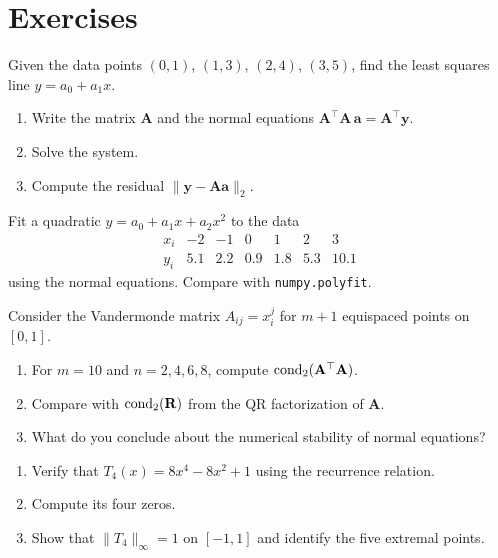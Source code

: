 \section{Exercises}

\begin{exercise}[$\star$]
\label{ex:ch6-ls-line}
Given the data points $(0,1)$, $(1,3)$, $(2,4)$, $(3,5)$, find the least squares line $y = a_0 + a_1 x$.
\begin{enumerate}
    \item Write the matrix $\mathbf{A}$ and the normal equations $\mathbf{A}^\top\mathbf{A}\,\mathbf{a} = \mathbf{A}^\top\mathbf{y}$.
    \item Solve the system.
    \item Compute the residual $\|\mathbf{y} - \mathbf{A}\mathbf{a}\|_2$.
\end{enumerate}
\end{exercise}

\begin{exercise}[$\star$]
\label{ex:ch6-parabola}
Fit a quadratic $y = a_0 + a_1 x + a_2 x^2$ to the data
\[
\begin{array}{c|cccccc}
    x_i & -2 & -1 & 0 & 1 & 2 & 3 \\
    \hline
    y_i & 5.1 & 2.2 & 0.9 & 1.8 & 5.3 & 10.1
\end{array}
\]
using the normal equations. Compare with \texttt{numpy.polyfit}.
\end{exercise}

\begin{exercise}[$\star\star$]
\label{ex:ch6-conditioning}
Consider the Vandermonde matrix $A_{ij} = x_i^j$ for $m+1$ equispaced points on $[0,1]$.
\begin{enumerate}
    \item For $m = 10$ and $n = 2, 4, 6, 8$, compute $\mathrm{cond}_2(\mathbf{A}^\top\mathbf{A})$.
    \item Compare with $\mathrm{cond}_2(\mathbf{R})$ from the QR factorization of $\mathbf{A}$.
    \item What do you conclude about the numerical stability of normal equations?
\end{enumerate}
\end{exercise}

\begin{exercise}[$\star\star$]
\label{ex:ch6-chebyshev-zeros}
\begin{enumerate}
    \item Verify that $T_4(x) = 8x^4 - 8x^2 + 1$ using the recurrence relation.
    \item Compute its four zeros.
    \item Show that $\|T_4\|_\infty = 1$ on $[-1,1]$ and identify the five extremal points.
\end{enumerate}
\end{exercise}

